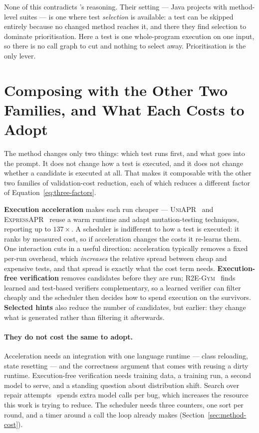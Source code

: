 None of this contradicts \citeauthor{lou2024aprregression}'s reasoning. Their
setting --- Java projects with method-level suites --- is one where test
\emph{selection} is available: a test can be skipped entirely because no
changed method reaches it, and there they find selection to dominate
prioritisation. Here a test is one whole-program execution on one input, so
there is no call graph to cut and nothing to select away. Prioritisation is the
only lever.

\section{Composing with the Other Two Families, and What Each Costs to Adopt}
\label{sec:disc-combining}

The method changes only two things: which test runs first, and what goes into
the prompt. It does not change how a test is executed, and it does not change
whether a candidate is executed at all. That makes it composable with the other
two families of validation-cost reduction, each of which reduces a different
factor of Equation~\eqref{eq:three-factors}.

\textbf{Execution acceleration} makes each run cheaper ---
\textsc{UniAPR}~\citep{chen2021uniapr} and
\textsc{ExpressAPR}~\citep{xiao2024expressapr} reuse a warm runtime and adapt
mutation-testing techniques, reporting up to $137\times$. A scheduler is
indifferent to how a test is executed: it ranks by measured cost, so if
acceleration changes the costs it re-learns them. One interaction cuts in a
useful direction: acceleration typically removes a fixed per-run overhead,
which \emph{increases} the relative spread between cheap and expensive tests,
and that spread is exactly what the cost term needs. \textbf{Execution-free
verification} removes candidates before they are run;
\textsc{R2E-Gym}~\citep{jain2025r2egym} finds learned and test-based verifiers
complementary, so a learned verifier can filter cheaply and the scheduler then
decides how to spend execution on the survivors. \textbf{Selected hints} also
reduce the number of candidates, but earlier: they change what is generated
rather than filtering it afterwards.

\paragraph{They do not cost the same to adopt.} Acceleration needs an
integration with one language runtime --- class reloading, state resetting ---
and the correctness argument that comes with reusing a dirty runtime.
Execution-free verification needs training data, a training run, a second model
to serve, and a standing question about distribution shift. Search over repair
attempts~\citep{antoniades2025swesearch} spends extra model calls per bug,
which increases the resource this work is trying to reduce. The scheduler needs
three counters, one sort per round, and a timer around a call the loop already
makes (Section~\ref{sec:method-cost}).

